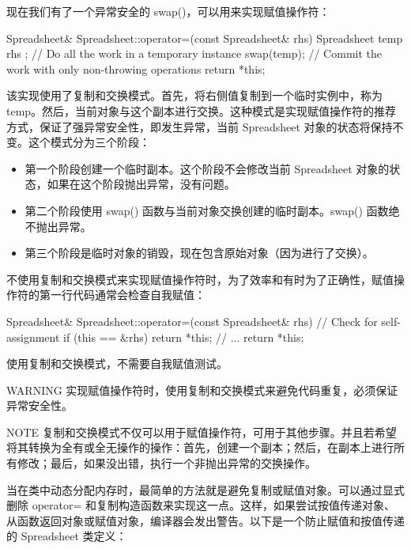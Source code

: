 现在我们有了一个异常安全的 swap()，可以用来实现赋值操作符：

\begin{cpp}
Spreadsheet& Spreadsheet::operator=(const Spreadsheet& rhs)
{
    Spreadsheet temp { rhs }; // Do all the work in a temporary instance
    swap(temp); // Commit the work with only non-throwing operations
    return *this;
}
\end{cpp}

该实现使用了复制和交换模式。首先，将右侧值复制到一个临时实例中，称为 temp。然后，当前对象与这个副本进行交换。这种模式是实现赋值操作符的推荐方式，保证了强异常安全性，即发生异常，当前 Spreadsheet 对象的状态将保持不变。这个模式分为三个阶段：

\begin{itemize}
\item
第一个阶段创建一个临时副本。这个阶段不会修改当前 Spreadsheet 对象的状态，如果在这个阶段抛出异常，没有问题。

\item
第二个阶段使用 swap() 函数与当前对象交换创建的临时副本。swap() 函数绝不抛出异常。

\item
第三个阶段是临时对象的销毁，现在包含原始对象（因为进行了交换）。
\end{itemize}

不使用复制和交换模式来实现赋值操作符时，为了效率和有时为了正确性，赋值操作符的第一行代码通常会检查自我赋值：

\begin{cpp}
Spreadsheet& Spreadsheet::operator=(const Spreadsheet& rhs)
{
    // Check for self-assignment
    if (this == &rhs) { return *this; }
    // ...
    return *this;
}
\end{cpp}

使用复制和交换模式，不需要自我赋值测试。

\begin{myWarning}{WARNING}
实现赋值操作符时，使用复制和交换模式来避免代码重复，必须保证异常安全性。
\end{myWarning}

\begin{myNotic}{NOTE}
复制和交换模式不仅可以用于赋值操作符，可用于其他步骤。并且若希望将其转换为全有或全无操作的操作：首先，创建一个副本；然后，在副本上进行所有修改；最后，如果没出错，执行一个非抛出异常的交换操作。
\end{myNotic}


当在类中动态分配内存时，最简单的方法就是避免复制或赋值对象。可以通过显式删除 operator= 和复制构造函数来实现这一点。这样，如果尝试按值传递对象、从函数返回对象或赋值对象，编译器会发出警告。以下是一个防止赋值和按值传递的 Spreadsheet 类定义：

